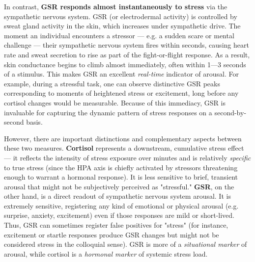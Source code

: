 In contrast, \textbf{GSR responds almost instantaneously to stress} via the
sympathetic nervous system. GSR (or electrodermal activity) is
controlled by sweat gland activity in the skin, which increases under
sympathetic drive. The moment an individual encounters a stressor ---
e.g. a sudden scare or mental challenge --- their sympathetic nervous
system fires within seconds, causing heart rate and sweat secretion to
rise as part of the fight-or-flight
response\cite{CortisolStressIndicator2020}.
As a result, skin conductance begins to climb almost immediately, often
within 1---3 seconds of a
stimulus\cite{ElectrodermalActivityWiki}.
This makes GSR an excellent \textit{real-time} indicator of arousal. For
example, during a stressful task, one can observe distinctive GSR peaks
corresponding to moments of heightened stress or excitement, long before
any cortisol changes would be
measurable\cite{CortisolStressIndicator2020}.
Because of this immediacy, GSR is invaluable for capturing the dynamic
pattern of stress responses on a second-by-second basis.

However, there are important distinctions and complementary aspects
between these two measures. \textbf{Cortisol} represents a downstream,
cumulative stress effect --- it reflects the intensity of stress exposure
over minutes and is relatively \textit{specific} to true stress (since the HPA
axis is chiefly activated by stressors threatening enough to warrant a
hormonal response). It is less sensitive to brief, transient arousal
that might not be subjectively perceived as "stressful." \textbf{GSR}, on the
other hand, is a direct readout of sympathetic nervous system arousal.
It is extremely sensitive, registering any kind of emotional or physical
arousal (e.g. surprise, anxiety, excitement) even if those responses are
mild or
short-lived\cite{DeviceServer}\cite{GSRPPGMachineLearning2024}.
Thus, GSR can sometimes register false positives for "stress" (for
instance, excitement or startle responses produce GSR changes but might
not be considered stress in the colloquial sense). GSR is more of a
\textit{situational marker} of arousal, while cortisol is a \textit{hormonal marker}
of systemic stress
load\cite{SimulatorValidityPhysiological2025}.

